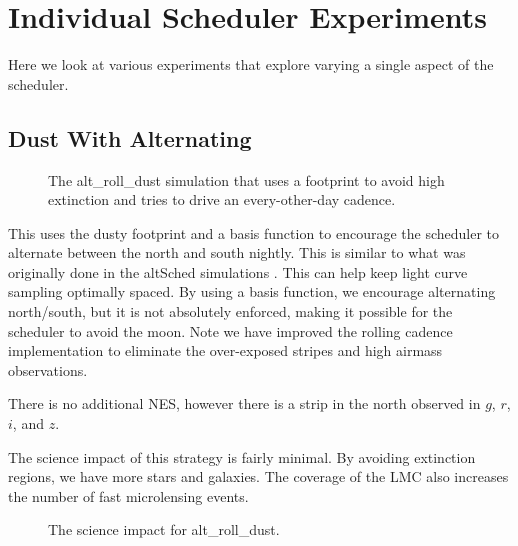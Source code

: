 

\section{Individual Scheduler Experiments}

Here we look at various experiments that explore varying a single aspect of the scheduler. 


\subsection{Dust With Alternating}

\begin{figure}
\caption{The alt\_roll\_dust simulation that uses a footprint to avoid high extinction and tries to drive an every-other-day cadence.}\label{fig:altdust}
\end{figure}

This uses the dusty footprint and a basis function to encourage the scheduler to alternate between the north and south nightly. This is similar to what was originally done in the altSched simulations \citep{Rothchild19}. This can help keep light curve sampling optimally spaced. By using a basis function, we encourage alternating north/south, but it is not absolutely enforced, making it possible for the scheduler to avoid the moon. Note we have improved the rolling cadence implementation to eliminate the over-exposed stripes and high airmass observations.

There is no additional NES, however there is a strip in the north observed in $g$, $r$, $i$, and $z$.

The science impact of this strategy is fairly minimal. By avoiding extinction regions, we have more stars and galaxies. The coverage of the LMC also increases the number of fast microlensing events. 

\begin{figure}
\caption{The science impact for alt\_roll\_dust.}
\end{figure}

